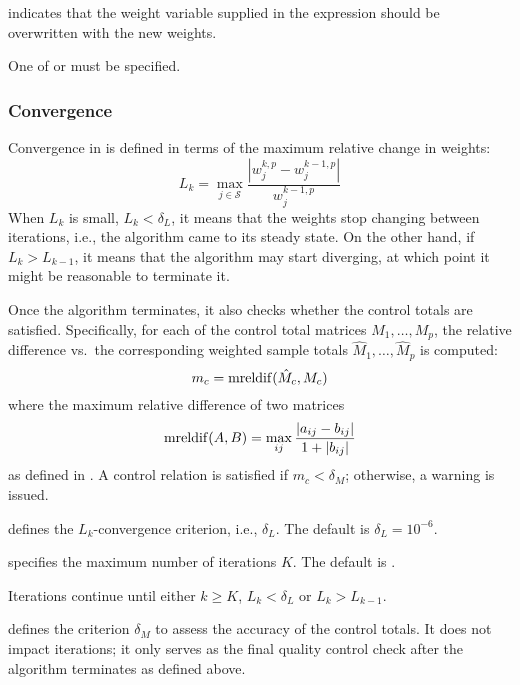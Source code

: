 \hangpara
{} indicates that the weight variable supplied in the
\stcmd{[pw=\varname]} expression should be overwritten with the new weights.

\morehang
One of  or  must be specified.

\subsubsection{Convergence}

\begin{sttech}
Convergence in  is defined in terms of the maximum relative
change in weights:
\begin{equation}
    L_k = \max_{j \in \mathcal{S}} \frac{|w_j^{k,p}-w_j^{k-1,p}|}{w_j^{k-1,p}}
    \label{eq:conv:ratio:weights}
\end{equation}
When $L_k$ is small, $L_k < \delta_L$, it means that the weights stop
changing between iterations, i.e., the algorithm came to its steady state.
On the other hand, if $L_k > L_{k-1}$, it means that the algorithm
may start diverging, at which point it might be reasonable to terminate it.

Once the algorithm terminates, it also checks whether the control totals
are satisfied. Specifically, for each of the control total matrices
$M_1, \ldots, M_p$, the relative difference vs.\ the corresponding weighted
sample totals $\hat M_1, \ldots, \hat M_p$ is computed:
\begin{equation}
    m_c = {\rm mreldif}( \hat M_c, M_c )
    \label{eq:conv:mreldif}
\end{equation}
where the maximum relative difference of two matrices
$$
{\rm mreldif}(A,B) = \max_{ij} \frac{|a_{ij}-b_{ij}|}{1+|b_{ij}|}
$$
as defined in . A control relation is satisfied
if $m_c < \delta_M$; otherwise, a warning is issued.

\end{sttech}

\hangpara
{} defines the $L_k$-convergence
criterion, i.e., $\delta_L$. The default is $\delta_L = 10^{-6}$.

\hangpara
{} specifies the maximum number
of iterations $K$.
The default is .

\morehang
Iterations continue until either $k \ge K$, $L_k < \delta_L$ or
$L_k > L_{k-1}$.

\hangpara
{} defines the criterion $\delta_M$ to
assess the accuracy of the control totals. It does not impact
iterations; it only serves as the final quality control check
after the algorithm terminates as defined above.


